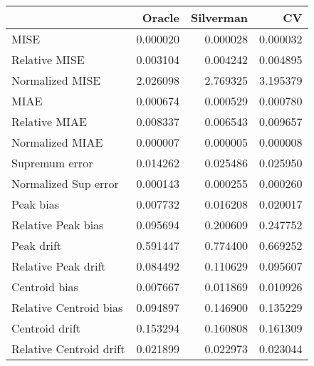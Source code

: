\begin{tabular}{lrrr}
  \toprule
 & Oracle & Silverman & CV \\ 
  \midrule
MISE & 0.000020 & 0.000028 & 0.000032 \\ 
  Relative MISE & 0.003104 & 0.004242 & 0.004895 \\ 
  Normalized MISE & 2.026098 & 2.769325 & 3.195379 \\ 
  MIAE & 0.000674 & 0.000529 & 0.000780 \\ 
  Relative MIAE & 0.008337 & 0.006543 & 0.009657 \\ 
  Normalized MIAE & 0.000007 & 0.000005 & 0.000008 \\ 
  Supremum error & 0.014262 & 0.025486 & 0.025950 \\ 
  Normalized Sup error & 0.000143 & 0.000255 & 0.000260 \\ 
  Peak bias & 0.007732 & 0.016208 & 0.020017 \\ 
  Relative Peak bias & 0.095694 & 0.200609 & 0.247752 \\ 
  Peak drift & 0.591447 & 0.774400 & 0.669252 \\ 
  Relative Peak drift & 0.084492 & 0.110629 & 0.095607 \\ 
  Centroid bias & 0.007667 & 0.011869 & 0.010926 \\ 
  Relative Centroid bias & 0.094897 & 0.146900 & 0.135229 \\ 
  Centroid drift & 0.153294 & 0.160808 & 0.161309 \\ 
  Relative Centroid drift & 0.021899 & 0.022973 & 0.023044 \\ 
   \bottomrule
\end{tabular}
